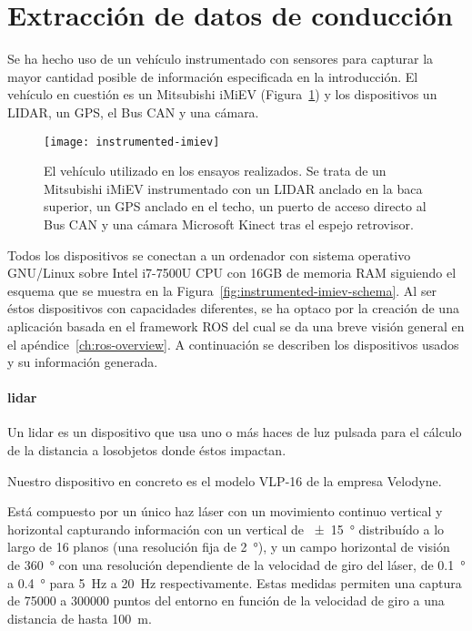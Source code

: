 \section{Extracción de datos de conducción}

Se ha hecho uso de un vehículo instrumentado con sensores para capturar la mayor cantidad posible de información especificada en la introducción. El vehículo en cuestión es un Mitsubishi iMiEV (Figura~\ref{fig:instrumented-imiev}) y los dispositivos un LIDAR, un GPS, el Bus CAN y una cámara.

\begin{figure}
	\texttt{[image: instrumented-imiev]}
	\caption{El vehículo utilizado en los ensayos realizados. Se trata de un Mitsubishi iMiEV instrumentado con un LIDAR anclado en la baca superior, un GPS anclado en el techo, un puerto de acceso directo al Bus CAN y una cámara Microsoft Kinect tras el espejo retrovisor.}
	\label{fig:instrumented-imiev}
\end{figure}

Todos los dispositivos se conectan a un ordenador con sistema operativo GNU/Linux sobre Intel i7-7500U CPU con 16GB de memoria RAM siguiendo el esquema que se muestra en la Figura~\ref{fig:instrumented-imiev-schema}. Al ser éstos dispositivos con capacidades diferentes, se ha optaco por la creación de una aplicación basada en el framework ROS del cual se da una breve visión general en el apéndice~\ref{ch:ros-overview}. A continuación se describen los dispositivos usados y su información generada.

\paragraph{\ac{lidar}}

Un \ac{lidar} es un dispositivo que usa uno o más haces de luz pulsada para el cálculo de la distancia a losobjetos donde éstos impactan.

Nuestro dispositivo en concreto es el modelo VLP-16 de la empresa Velodyne.

Está compuesto por un único haz láser con un movimiento continuo vertical y horizontal capturando información con un vertical de \SI{\pm15}{\degree} distribuído a lo largo de 16 planos (una resolución fija de \SI{2}{\degree}), y un campo horizontal de visión de \SI{360}{\degree} con una resolución dependiente de la velocidad de giro del láser, de \SI{0.1}{\degree} a \SI{0.4}{\degree} para \SI{5}{\Hz} a \SI{20}{\Hz} respectivamente. Estas medidas permiten una captura de 75000 a 300000 puntos del entorno en función de la velocidad de giro a una distancia de hasta \SI{100}{\meter}.

